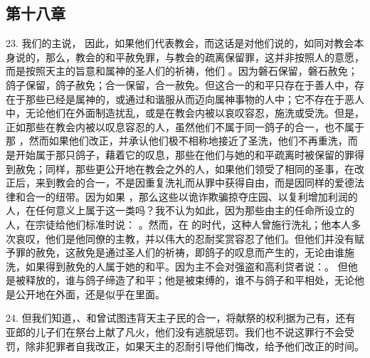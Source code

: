 
\subsection{第十八章}

23.  我们的主说，  因此，如果他们代表教会，而这话是对他们说的，如同对教会本身说的，那么，教会的和平赦免罪，与教会的疏离保留罪，这并非按照人的意愿，而是按照天主的旨意和属神的圣人们的祈祷，他们  。因为磐石保留，磐石赦免；鸽子保留，鸽子赦免；合一保留，合一赦免。但这合一的和平只存在于善人中，存在于那些已经是属神的，或通过和谐服从而迈向属神事物的人中；它不存在于恶人中，无论他们在外面制造扰乱，或是在教会内被以哀叹容忍，施洗或受洗。但是，正如那些在教会内被以叹息容忍的人，虽然他们不属于同一鸽子的合一，也不属于那 ，然而如果他们改正，并承认他们极不相称地接近了圣洗，他们不再重洗，而是开始属于那只鸽子，藉着它的叹息，那些在他们与她的和平疏离时被保留的罪得到赦免；同样，那些更公开地在教会之外的人，如果他们领受了相同的圣事，在改正后，来到教会的合一，不是因重复洗礼而从罪中获得自由，而是因同样的爱德法律和合一的纽带。因为如果 ，那么这些以诡诈欺骗掠夺庄园、以复利增加利润的人，在任何意义上属于这一类吗？我不认为如此，因为那些由主的任命所设立的人，在宗徒给他们标准时说： 。然而，在  的时代，这种人曾施行洗礼；他本人多次哀叹，他们是他同僚的主教，并以伟大的忍耐奖赏容忍了他们。但他们并没有赋予罪的赦免，这赦免是通过圣人们的祈祷，即鸽子的叹息而产生的，无论由谁施洗，如果得到赦免的人属于她的和平。因为主不会对强盗和高利贷者说：。  但他是被释放的，谁与鸽子缔造了和平；他是被束缚的，谁不与鸽子和平相处，无论他是公开地在外面，还是似乎在里面。\par

24. 但我们知道，、和曾试图违背天主子民的合一，将献祭的权利据为己有，还有亚郎的儿子们在祭台上献了凡火，他们没有逃脱惩罚。我们也不说这罪行不会受罚，除非犯罪者自我改正，如果天主的忍耐引导他们悔改，给予他们改正的时间。\par

